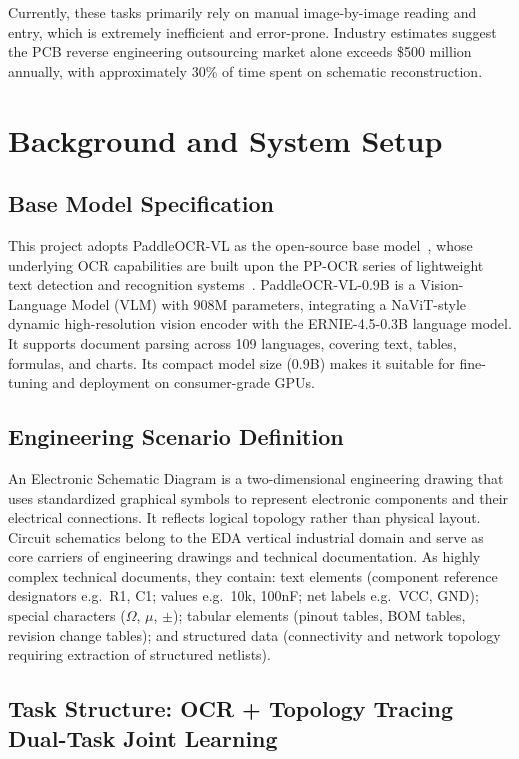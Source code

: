 Currently, these tasks primarily rely on manual image-by-image reading and entry, which is extremely inefficient and error-prone. Industry estimates suggest the PCB reverse engineering outsourcing market alone exceeds \$500 million annually, with approximately 30\% of time spent on schematic reconstruction.


\section{Background and System Setup}
\label{sec:headings}

\subsection{Base Model Specification}

This project adopts PaddleOCR-VL as the open-source base model~\citep{cui2025paddleocrvl}, whose underlying OCR capabilities are built upon the PP-OCR series of lightweight text detection and recognition systems~\citep{li2022ppocrv3}. PaddleOCR-VL-0.9B is a Vision-Language Model (VLM) with 908M parameters, integrating a NaViT-style dynamic high-resolution vision encoder with the ERNIE-4.5-0.3B language model. It supports document parsing across 109 languages, covering text, tables, formulas, and charts. Its compact model size (0.9B) makes it suitable for fine-tuning and deployment on consumer-grade GPUs.

\subsection{Engineering Scenario Definition}

An Electronic Schematic Diagram is a two-dimensional engineering drawing that uses standardized graphical symbols to represent electronic components and their electrical connections. It reflects logical topology rather than physical layout. Circuit schematics belong to the EDA vertical industrial domain and serve as core carriers of engineering drawings and technical documentation. As highly complex technical documents, they contain: text elements (component reference designators e.g.\ R1, C1; values e.g.\ 10k, 100nF; net labels e.g.\ VCC, GND); special characters ($\Omega$, $\mu$, $\pm$); tabular elements (pinout tables, BOM tables, revision change tables); and structured data (connectivity and network topology requiring extraction of structured netlists).

\subsection{Task Structure: OCR + Topology Tracing Dual-Task Joint Learning}

